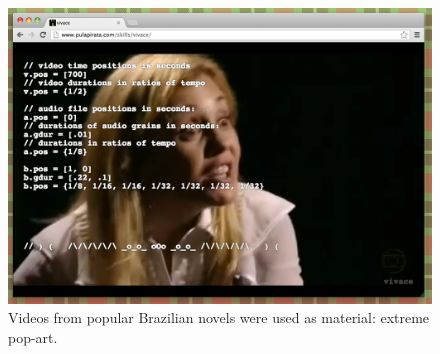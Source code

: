 \documentclass[letterpaper, 12pt]{article}
\begin{document}

\begin{figure}[htpb]
  \begin{center}
    \includegraphics[scale=.3]{img/fig_novela.png}
    \caption{Videos from popular Brazilian novels were used as
      material: extreme pop-art.}
    \label{fig:novela}
  \end{center}
\end{figure}

\end{document}
